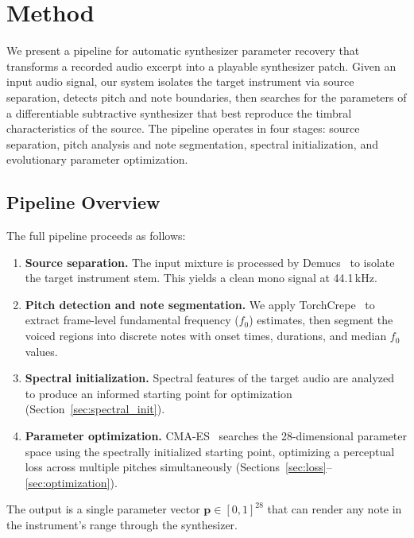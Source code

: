 \section{Method}
\label{sec:method}

We present a pipeline for automatic synthesizer parameter recovery that transforms a recorded audio excerpt into a playable synthesizer patch. Given an input audio signal, our system isolates the target instrument via source separation, detects pitch and note boundaries, then searches for the parameters of a differentiable subtractive synthesizer that best reproduce the timbral characteristics of the source. The pipeline operates in four stages: source separation, pitch analysis and note segmentation, spectral initialization, and evolutionary parameter optimization.

\subsection{Pipeline Overview}
\label{sec:pipeline}

The full pipeline proceeds as follows:

\begin{enumerate}
    \item \textbf{Source separation.} The input mixture is processed by Demucs~\citep{defossez2021hybrid} to isolate the target instrument stem. This yields a clean mono signal at 44.1\,kHz.
    \item \textbf{Pitch detection and note segmentation.} We apply TorchCrepe~\citep{kim2018crepe} to extract frame-level fundamental frequency ($f_0$) estimates, then segment the voiced regions into discrete notes with onset times, durations, and median $f_0$ values.
    \item \textbf{Spectral initialization.} Spectral features of the target audio are analyzed to produce an informed starting point for optimization (Section~\ref{sec:spectral_init}).
    \item \textbf{Parameter optimization.} CMA-ES~\citep{hansen2016cmaes} searches the 28-dimensional parameter space using the spectrally initialized starting point, optimizing a perceptual loss across multiple pitches simultaneously (Sections~\ref{sec:loss}--\ref{sec:optimization}).
\end{enumerate}

The output is a single parameter vector $\mathbf{p} \in [0, 1]^{28}$ that can render any note in the instrument's range through the synthesizer.


